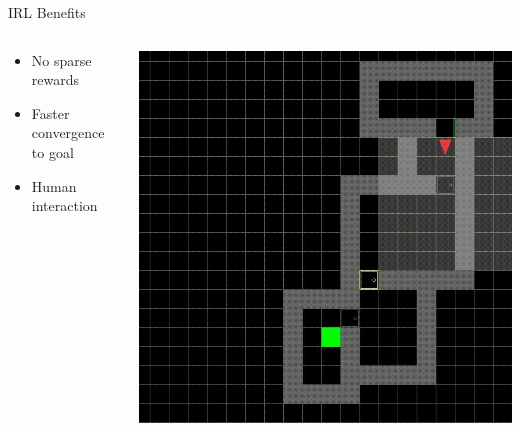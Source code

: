\begin{frame}{IRL Benefits}
	

	\begin{columns}
		\begin{column}{0.5\textwidth}
			
			\begin{itemize}
				\item No sparse rewards
				\vspace{0.5cm}
				\item Faster convergence to goal 
				\vspace{0.5cm}
				\item Human interaction
			\end{itemize}
			
		\end{column}
		\begin{column}{0.5\textwidth}
			\centering
			\includegraphics[width=0.7\linewidth]{images/env.jpg}			
		\end{column}
		
	\end{columns}
\end{frame}


